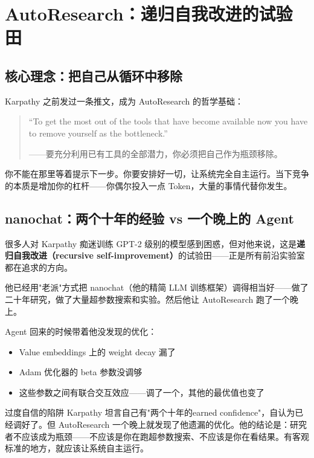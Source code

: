 \section{AutoResearch：递归自我改进的试验田}

\subsection{核心理念：把自己从循环中移除}

Karpathy 之前发过一条推文，成为 AutoResearch 的哲学基础：

\begin{quote}
``To get the most out of the tools that have become available now you have to remove yourself as the bottleneck.''

——要充分利用已有工具的全部潜力，你必须把自己作为瓶颈移除。
\end{quote}

你不能在那里等着提示下一步。你要安排好一切，让系统完全自主运行。当下竞争的本质是增加你的杠杆——你偶尔投入一点 Token，大量的事情代替你发生。

\subsection{nanochat：两个十年的经验 vs 一个晚上的 Agent}

很多人对 Karpathy 痴迷训练 GPT-2 级别的模型感到困惑，但对他来说，这是\textbf{递归自我改进（recursive self-improvement）}的试验田——正是所有前沿实验室都在追求的方向。

他已经用"老派"方式把 nanochat（他的精简 LLM 训练框架）调得相当好——做了二十年研究，做了大量超参数搜索和实验。然后他让 AutoResearch 跑了一个晚上。

Agent 回来的时候带着他没发现的优化：
\begin{itemize}
    \item Value embeddings 上的 weight decay 漏了
    \item Adam 优化器的 beta 参数没调够
    \item 这些参数之间有联合交互效应——调了一个，其他的最优值也变了
\end{itemize}

\begin{warningbox}{过度自信的陷阱}
Karpathy 坦言自己有"两个十年的earned confidence"，自认为已经调好了。但 AutoResearch 一个晚上就发现了他遗漏的优化。他的结论是：研究者不应该成为瓶颈——不应该是你在跑超参数搜索、不应该是你在看结果。有客观标准的地方，就应该让系统自主运行。
\end{warningbox}

